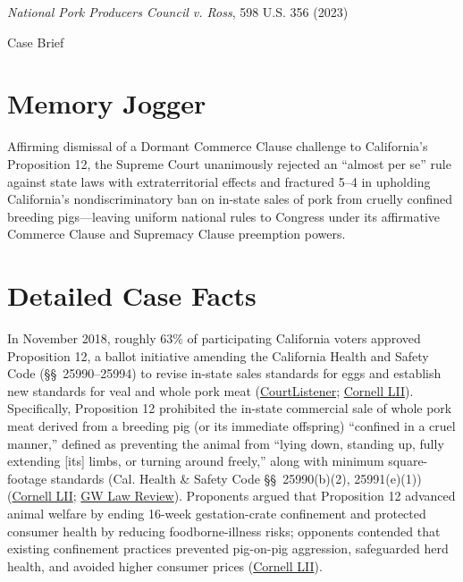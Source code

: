 \documentclass[12pt]{article}
\begin{document}
\begin{center}
{\LARGE \textit{National Pork Producers Council v. Ross}, 598 U.S. 356 (2023)\par}
\vspace{0.8em}
{\large Case Brief\par}
\end{center}
\vspace{1em}

\section{Memory Jogger}
Affirming dismissal of a Dormant Commerce Clause challenge to California's Proposition 12, the Supreme Court unanimously rejected an ``almost per se'' rule against state laws with extraterritorial effects and fractured 5--4 in upholding California's nondiscriminatory ban on in-state sales of pork from cruelly confined breeding pigs---leaving uniform national rules to Congress under its affirmative Commerce Clause and Supremacy Clause preemption powers.

\section{Detailed Case Facts}
In November 2018, roughly 63\% of participating California voters approved Proposition 12, a ballot initiative amending the California Health and Safety Code (\S\S~25990--25994) to revise in-state sales standards for eggs and establish new standards for veal and whole pork meat (\href{https://www.courtlistener.com/opinion/10049695/national-pork-producers-council-v-ross/}{CourtListener}; \href{https://www.law.cornell.edu/supremecourt/text/21-468}{Cornell LII}). Specifically, Proposition 12 prohibited the in-state commercial sale of whole pork meat derived from a breeding pig (or its immediate offspring) ``confined in a cruel manner,'' defined as preventing the animal from ``lying down, standing up, fully extending [its] limbs, or turning around freely,'' along with minimum square-footage standards (Cal. Health \& Safety Code \S\S~25990(b)(2), 25991(e)(1)) (\href{https://www.law.cornell.edu/supremecourt/text/21-468}{Cornell LII}; \href{https://www.gwlr.org/national-pork-producers-council-v-ross-a-win-for-farmed-pigs/}{GW Law Review}). Proponents argued that Proposition 12 advanced animal welfare by ending 16-week gestation-crate confinement and protected consumer health by reducing foodborne-illness risks; opponents contended that existing confinement practices prevented pig-on-pig aggression, safeguarded herd health, and avoided higher consumer prices (\href{https://www.law.cornell.edu/supremecourt/text/21-468}{Cornell LII}).
\end{document}
